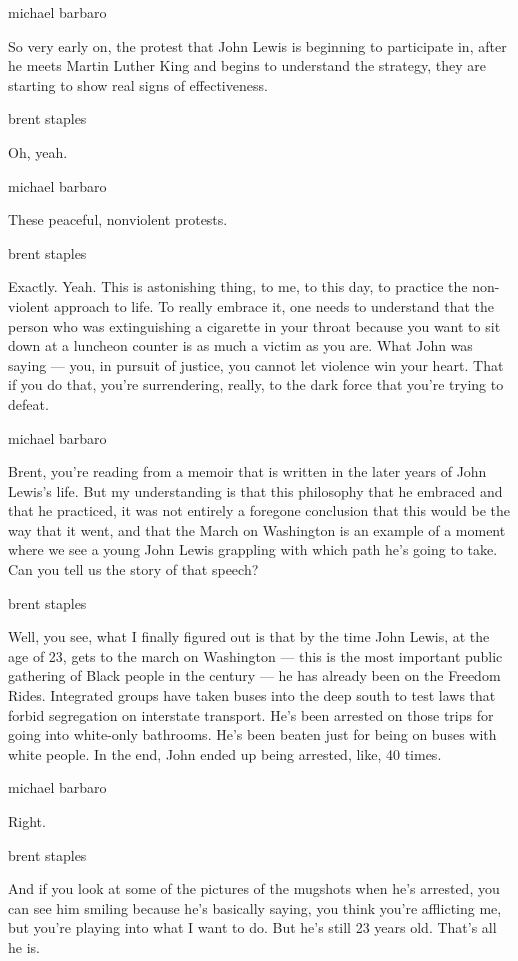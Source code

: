 michael barbaro

So very early on, the protest that John Lewis is beginning to
participate in, after he meets Martin Luther King and begins to
understand the strategy, they are starting to show real signs of
effectiveness.

brent staples

Oh, yeah.

michael barbaro

These peaceful, nonviolent protests.

brent staples

Exactly. Yeah. This is astonishing thing, to me, to this day, to
practice the non-violent approach to life. To really embrace it, one
needs to understand that the person who was extinguishing a cigarette in
your throat because you want to sit down at a luncheon counter is as
much a victim as you are. What John was saying --- you, in pursuit of
justice, you cannot let violence win your heart. That if you do that,
you're surrendering, really, to the dark force that you're trying to
defeat.

michael barbaro

Brent, you're reading from a memoir that is written in the later years
of John Lewis's life. But my understanding is that this philosophy that
he embraced and that he practiced, it was not entirely a foregone
conclusion that this would be the way that it went, and that the March
on Washington is an example of a moment where we see a young John Lewis
grappling with which path he's going to take. Can you tell us the story
of that speech?

brent staples

Well, you see, what I finally figured out is that by the time John
Lewis, at the age of 23, gets to the march on Washington --- this is the
most important public gathering of Black people in the century --- he
has already been on the Freedom Rides. Integrated groups have taken
buses into the deep south to test laws that forbid segregation on
interstate transport. He's been arrested on those trips for going into
white-only bathrooms. He's been beaten just for being on buses with
white people. In the end, John ended up being arrested, like, 40 times.

michael barbaro

Right.

brent staples

And if you look at some of the pictures of the mugshots when he's
arrested, you can see him smiling because he's basically saying, you
think you're afflicting me, but you're playing into what I want to do.
But he's still 23 years old. That's all he is.

